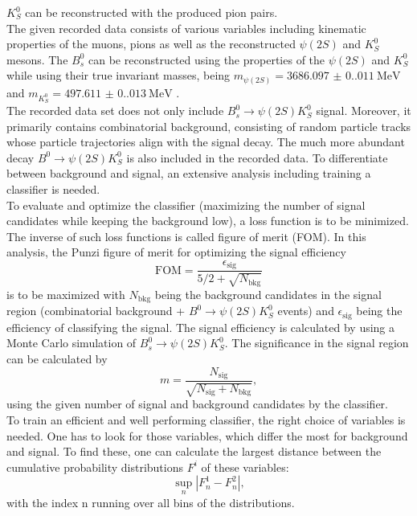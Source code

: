 $K_S^0$ can be reconstructed with the produced pion pairs.\\
The given recorded data consists of various variables including kinematic properties of the muons, pions as well as the reconstructed $\psi (2S)$ and $K_S^0$ mesons. The $B_s^0$ can be reconstructed using the
properties of the $\psi (2S)$ and $K_S^0$ while using their true invariant masses, being $m_{\psi (2S)} = \qty{3686.097(0.011)}{\mega\electronvolt}$ and $m_{K_S^0} = \qty{497.611(0.013)}{\mega\electronvolt}$ \cite{PDG}.\\
The recorded data set does not only include $B_s^0 \to \psi (2S)K_S^0$ signal. Moreover, it primarily contains combinatorial background, consisting of random particle tracks whose particle trajectories align with the
signal decay. The much more abundant decay $B^0 \to \psi (2S)K_S^0$ is also included in the recorded data. To differentiate between background and signal, an extensive analysis including
training a classifier is needed.\\
To evaluate and optimize the classifier (maximizing the number of signal candidates while keeping the background low), a loss function is to be minimized. The inverse of such loss functions is called figure of merit (FOM).
In this analysis, the Punzi figure of merit for optimizing the signal efficiency
\begin{equation}
    \label{eq:FOM}
    \mathrm{FOM}  = \frac{\epsilon_{\mathrm{sig}}}{5/2 + \sqrt{N_{\mathrm{bkg}}}}
\end{equation}
is to be maximized with $N_{\mathrm{bkg}}$ being the background candidates in the signal region (combinatorial background + $B^0 \to \psi (2S)K_S^0$ events) and $\epsilon_{\mathrm{sig}}$ being the efficiency of classifying
the signal. The signal efficiency is calculated by using a Monte Carlo simulation of $B_s^0 \to \psi (2S)K_S^0$. The significance in the signal region can be calculated by
\begin{equation}
    \label{eq:sign}
    m = \frac{N_{\mathrm{sig}}}{\sqrt{N_{\mathrm{sig}} + N_{\mathrm{bkg}}}},
\end{equation}
using the given number of signal and background candidates by the classifier.\\
To train an efficient and well performing classifier, the right choice of variables is needed. One has to look for those variables, which differ the most for background and signal. To find these, one can calculate the 
largest distance between the cumulative probability distributions $F^i$ of these variables:
\begin{equation}
    \label{eq:Kolmogorov}
    \sup\limits_{n} | F_n^1 - F_n^2 |,
\end{equation}
with the index n running over all bins of the distributions. 
